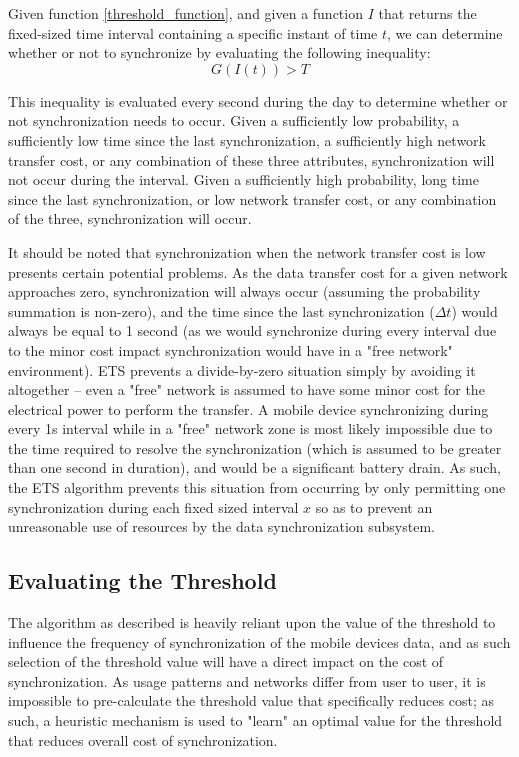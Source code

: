 Given function \ref{threshold_function}, and given a function $I$ that returns the fixed-sized time interval containing a specific instant of time $t$, we can determine whether or not to synchronize by evaluating the following inequality:
\begin{equation}
G(I(t)) > T \label{threshold_inequality}
\end{equation}

This inequality is evaluated every second during the day to determine whether or not synchronization needs to occur.  Given a sufficiently low probability, a sufficiently low time since the last synchronization, a sufficiently high network transfer cost, or any combination of these three attributes, synchronization will not occur during the interval.  Given a sufficiently high probability, long time since the last synchronization, or low network transfer cost, or any combination of the three, synchronization will occur.

It should be noted that synchronization when the network transfer cost is low presents certain potential problems.  As the data transfer cost for a given network approaches zero, synchronization will always occur (assuming the probability summation is non-zero), and the time since the last synchronization ($\Delta t$) would always be equal to 1 second (as we would synchronize during every interval due to the minor cost impact synchronization would have in a "free network" environment).  ETS prevents a divide-by-zero situation simply by avoiding it altogether -- even a "free" network is assumed to have some minor cost for the electrical power to perform the transfer. A mobile device synchronizing during every 1s interval while in a "free" network zone is most likely impossible due to the time required to resolve the synchronization (which is assumed to be greater than one second in duration), and would be a significant battery drain.  As such, the ETS algorithm prevents this situation from occurring by only permitting one synchronization during each fixed sized interval $x$ so as to prevent an unreasonable use of resources by the data synchronization subsystem.

\subsection{Evaluating the Threshold}

The algorithm as described is heavily reliant upon the value of the threshold to influence the frequency of synchronization of the mobile devices data, and as such selection of the threshold value will have a direct impact on the cost of synchronization.  As usage patterns and networks differ from user to user, it is impossible to pre-calculate the threshold value that specifically reduces cost; as such, a heuristic mechanism is used to "learn" an optimal value for the threshold that reduces overall cost of synchronization.

